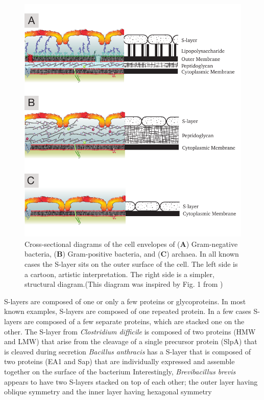 \begin{figure}[htb] %
  \begin{center}
    \includegraphics{intro/img/celwalls.pdf}
  \end{center}
  \caption[Cross-sectional diagrams of \ac{S-layer} containing cell envelopes]{Cross-sectional diagrams of the cell envelopes of (\textbf{A}) Gram-negative bacteria, (\textbf{B})
Gram-positive bacteria, and (\textbf{C}) archaea. In all known cases the \ac{S-layer} sits on the outer surface of the cell. The left side is a cartoon, artistic
interpretation. The right side is a simpler, structural diagram.(This diagram was inspired by Fig. 1 from )}
  \label{fig:cellwalls}
\end{figure}

\Acp{S-layer} are composed of one or only a few proteins or glycoproteins. In most known examples, \acp{S-layer} are composed of one repeated protein. In a few cases \acp{S-layer}
are composed of a few separate proteins, which are stacked one on the other. The \ac{S-layer} from \textit{Clostridium difficile} is composed of two proteins (HMW and LMW) that
arise from the cleavage of a single precursor protein (SlpA) that is cleaved during secretion \textit{Bacillus anthracis} has a
\ac{S-layer} that is composed of two proteins (EA1 and Sap) that are individually expressed and assemble together on the surface of the bacterium
Interestingly, \textit{Brevibacillus brevis} appears to have two \acp{S-layer} stacked on top of each other; the outer layer having oblique symmetry and the inner layer having
hexagonal symmetry
    
